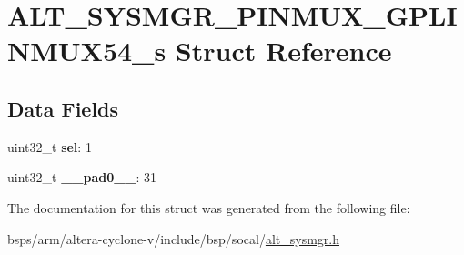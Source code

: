 \hypertarget{structALT__SYSMGR__PINMUX__GPLINMUX54__s}{}\section{A\+L\+T\+\_\+\+S\+Y\+S\+M\+G\+R\+\_\+\+P\+I\+N\+M\+U\+X\+\_\+\+G\+P\+L\+I\+N\+M\+U\+X54\+\_\+s Struct Reference}
\label{structALT__SYSMGR__PINMUX__GPLINMUX54__s}
\subsection*{Data Fields}
\begin{DoxyCompactItemize}
\item 
\mbox{\label{structALT__SYSMGR__PINMUX__GPLINMUX54__s_a45abe69e5149ad3fac8d719cc1bd1bed}} 
uint32\+\_\+t {\bfseries sel}\+: 1
\item 
\mbox{\label{structALT__SYSMGR__PINMUX__GPLINMUX54__s_a021c6f7c34e2795bb1a585b42fcf2869}} 
uint32\+\_\+t {\bfseries \+\_\+\+\_\+pad0\+\_\+\+\_\+}\+: 31
\end{DoxyCompactItemize}


The documentation for this struct was generated from the following file\+:\begin{DoxyCompactItemize}
\item 
bsps/arm/altera-\/cyclone-\/v/include/bsp/socal/\mbox{\hyperlink{alt__sysmgr_8h}{alt\+\_\+sysmgr.\+h}}\end{DoxyCompactItemize}
